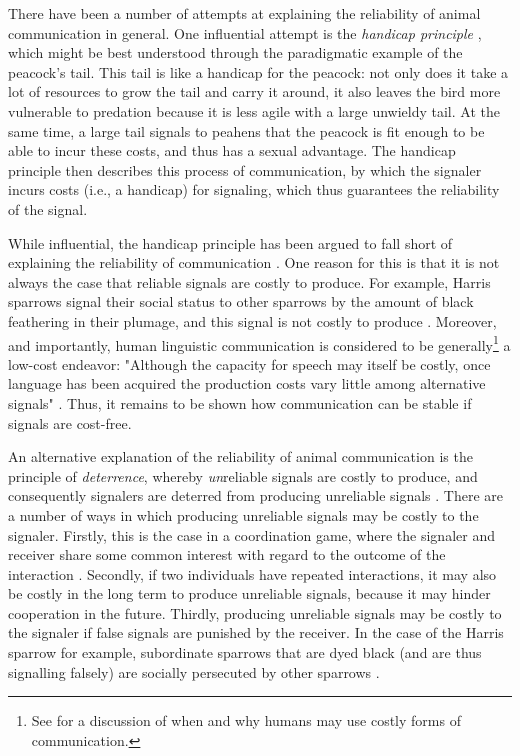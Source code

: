 There have been a number of attempts at explaining the reliability of animal communication in general. One influential attempt is the \emph{handicap principle} \citep{Zahavi75, Zahavi99}, which might be best understood through the paradigmatic example of the peacock's tail.
This tail is like a handicap for the peacock: not only does it take a lot of resources to grow the tail and carry it around, it also leaves the bird more vulnerable to predation because it is less agile with a large unwieldy tail. At the same time, a large tail signals to peahens that the peacock is fit enough to be able to incur these costs, and thus has a sexual advantage.
The handicap principle then describes this process of communication, by which the signaler incurs costs (i.e., a handicap) for signaling, which thus guarantees the reliability of the signal.

While influential, the handicap principle has been argued to fall short of explaining the reliability of communication \citep{Penn20, Scott-Phillips08}.
One reason for this is that it is not always the case that reliable signals are costly to produce. For example, Harris sparrows signal their social status to other sparrows by the amount of black feathering in their plumage, and this signal is not costly to produce \citep[p.~13191]{Lachmann01}.
Moreover, and importantly, human linguistic communication is considered to be generally\footnote{See \citet[p.~13193]{Lachmann01} for a discussion of when and why humans may use costly forms of communication.} a low-cost endeavor: "Although the capacity for speech may itself be costly, once language has been acquired the production costs vary little among alternative signals" \citep[p.~13192]{Lachmann01}.
Thus, it remains to be shown how communication can be stable if signals are cost-free.

An alternative explanation of the reliability of animal communication is the principle of \emph{deterrence}, whereby \emph{un}reliable signals are costly to produce, and consequently signalers are deterred from producing unreliable signals \citep{Scott-Phillips08}.
There are a number of ways in which producing unreliable signals may be costly to the signaler. Firstly, this is the case in a coordination game, where the signaler and receiver share some common interest with regard to the outcome of the interaction \citep[see][]{Smith94}.
Secondly, if two individuals have repeated interactions, it may also be costly in the long term to produce unreliable signals, because it may hinder cooperation in the future.
Thirdly, producing unreliable signals may be costly to the signaler if false signals are punished by the receiver. In the case of the Harris sparrow for example, subordinate sparrows that are dyed black (and are thus signalling falsely) are socially persecuted by other sparrows \citep{Rohwer78}.

